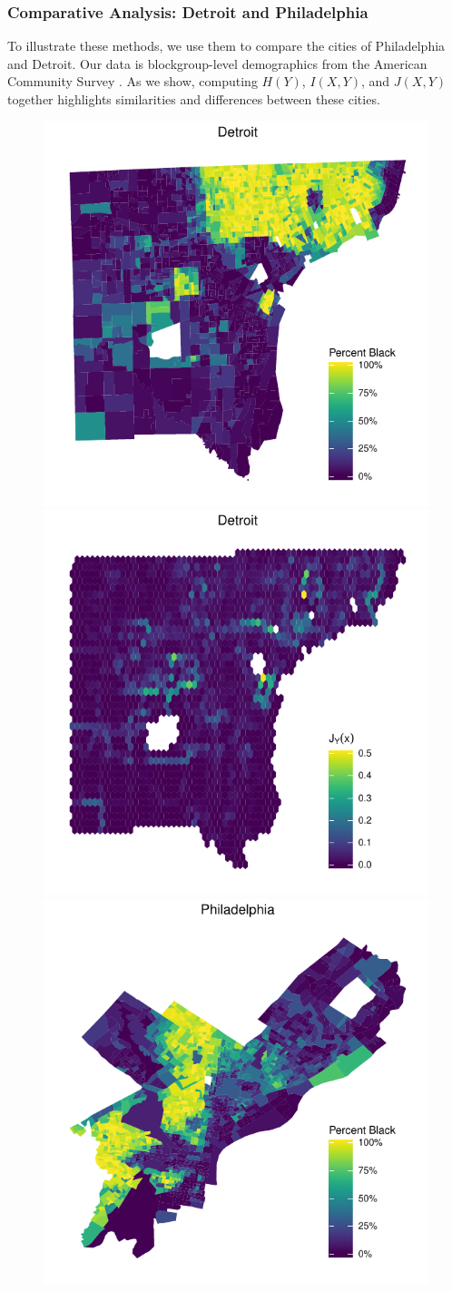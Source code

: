 \documentclass[english]{scrartcl}
\begin{document}
		\subsubsection{Comparative Analysis: Detroit and Philadelphia}
			To illustrate these methods, we use them to compare the cities of Philadelphia and Detroit. Our data is blockgroup-level demographics from the American Community Survey \cite{CensusRace}. As we show, computing $H(Y)$, $I(X,Y)$, and $J(X,Y)$ together highlights similarities and differences between these cities. 
			\begin{figure}
				\includegraphics[width = .5\textwidth]{figs/Detroit_percent_black.pdf}
				\includegraphics[width = .5\textwidth]{figs/Detroit_grid.pdf} \\
				\includegraphics[width = .5\textwidth]{figs/Philadelphia_percent_black.pdf}

\end{figure}
\end{document}
